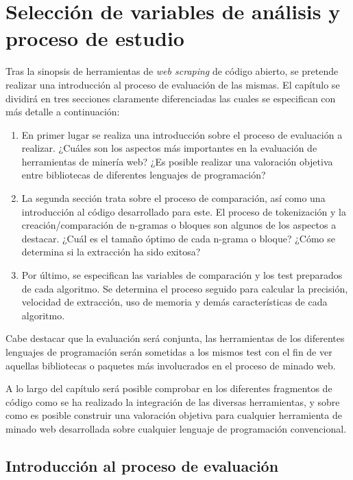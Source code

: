 
\chapter{Selección de variables de análisis y proceso de estudio}
\label{cha:seleccion de variables de analisis y proceso de estudio}

Tras la sinopsis de herramientas de \emph{web scraping} de código abierto, se pretende realizar una 
introducción al proceso de evaluación de las mismas. El capítulo se dividirá en tres secciones claramente 
diferenciadas las cuales se especifican con más detalle a continuación:

\begin{enumerate}
  \item En primer lugar se realiza una introducción sobre el proceso de evaluación a realizar. ¿Cuáles
  son los aspectos más importantes en la evaluación de herramientas de minería web? ¿Es posible realizar 
  una valoración objetiva entre bibliotecas de diferentes lenguajes de programación?
  \item La segunda sección trata sobre el proceso de comparación, así como una introducción al código
  desarrollado para este. El proceso de tokenización y la creación/comparación de n-gramas o bloques son 
  algunos de los aspectos a destacar. ¿Cuál es el tamaño óptimo de cada n-grama o bloque? ¿Cómo se determina 
  si la extracción ha sido exitosa?
  \item Por último, se especifican las variables de comparación y los test preparados de cada algoritmo.
  Se determina el proceso seguido para calcular la precisión, velocidad de extracción, uso de memoria
  y demás características de cada algoritmo.
\end{enumerate}

Cabe destacar que la evaluación será conjunta, las herramientas de los diferentes lenguajes de programación 
serán sometidas a los mismos test con el fin de ver aquellas bibliotecas o paquetes más involucrados en el 
proceso de minado web. 

A lo largo del capítulo será posible comprobar en los diferentes fragmentos de código como se ha realizado
la integración de las diversas herramientas, y sobre como es posible construir una valoración objetiva para
cualquier herramienta de minado web desarrollada sobre cualquier lenguaje de programación convencional.

\section{Introducción al proceso de evaluación}
\label{sec:introduccion al proceso de evaluacion}

